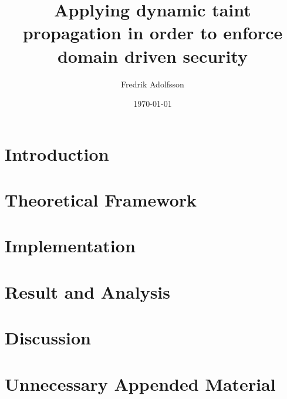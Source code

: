 \documentclass{kththesis}
\title{Applying dynamic taint propagation in order to enforce domain driven security}
\author{Fredrik Adolfsson}
\date{\today}
\begin{document}
\frontmatter


\titlepage





\tableofcontents


\mainmatter


\chapter{Introduction}


\chapter{Theoretical Framework}


\chapter{Implementation}


\chapter{Result and Analysis}


\chapter{Discussion}



\printbibliography[heading=bibintoc] %

\appendix

\chapter{Unnecessary Appended Material}
\end{document}
